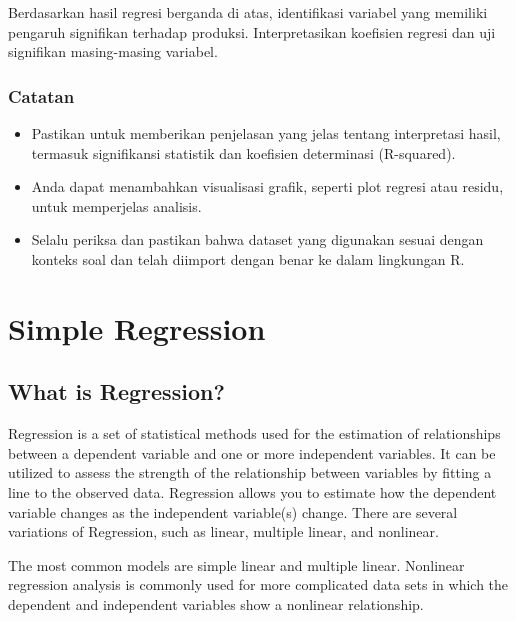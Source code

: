 \documentclass[
]{book}
\providecommand{\tightlist}{%
  \setlength{\itemsep}{0pt}\setlength{\parskip}{0pt}}
\begin{document}
Berdasarkan hasil regresi berganda di atas, identifikasi variabel yang memiliki pengaruh signifikan terhadap produksi. Interpretasikan koefisien regresi dan uji signifikan masing-masing variabel.

\hypertarget{catatan}{%
\subsection*{Catatan}\label{catatan}}

\begin{itemize}
\tightlist
\item
  Pastikan untuk memberikan penjelasan yang jelas tentang interpretasi hasil, termasuk signifikansi statistik dan koefisien determinasi (R-squared).
\item
  Anda dapat menambahkan visualisasi grafik, seperti plot regresi atau residu, untuk memperjelas analisis.
\item
  Selalu periksa dan pastikan bahwa dataset yang digunakan sesuai dengan konteks soal dan telah diimport dengan benar ke dalam lingkungan R.
\end{itemize}

\hypertarget{simple-regression-1}{%
\chapter{Simple Regression}\label{simple-regression-1}}

\hypertarget{what-is-regression}{%
\section{What is Regression?}\label{what-is-regression}}

Regression is a set of statistical methods used for the estimation of relationships between a dependent variable and one or more independent variables. It can be utilized to assess the strength of the relationship between variables by fitting a line to the observed data. Regression allows you to estimate how the dependent variable changes as the independent variable(s) change. There are several variations of Regression, such as linear, multiple linear, and nonlinear.

The most common models are simple linear and multiple linear. Nonlinear regression analysis is commonly used for more complicated data sets in which the dependent and independent variables show a nonlinear relationship.
\end{document}
